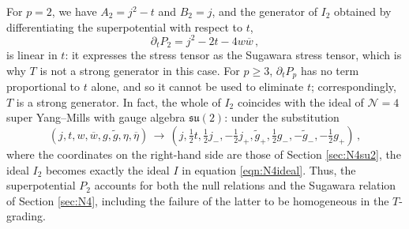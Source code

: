 \documentclass[12pt]{article}
\numberwithin{equation}{section}
\numberwithin{figure}{section}
\theoremstyle{plain}
\theoremstyle{definition}
\begin{document}
For $p = 2$, we have $A_2 = j^2 - t$ and $B_2 = j$, and the generator of $I_2$ obtained by differentiating the superpotential with respect to $t$,
\begin{equation}
    \partial_t P_2 = j^2 - 2t - 4 w \overline{w} \,,
\end{equation}
is linear in $t$: it expresses the stress tensor as the Sugawara stress tensor, which is why $T$ is not a strong generator in this case. For $p \geq 3$, $\partial_t P_p$ has no term proportional to $t$ alone, and so it cannot be used to eliminate $t$; correspondingly, $T$ is a strong generator. In fact, the whole of $I_2$ coincides with the ideal of $\mathcal{N}=4$ super Yang--Mills with gauge algebra $\mathfrak{su}(2)$: under the substitution
\begin{equation}
    (j, t, w, \overline{w}, g, \widetilde{g}, \eta, \overline{\eta}) \,\rightarrow\, \left(j, \tfrac{1}{2} t, \tfrac{1}{2} j_-, -\tfrac{1}{2} j_+, \widetilde{g}_+, \tfrac{1}{2} g_-, -\widetilde{g}_-, -\tfrac{1}{2} g_+\right) \,,
\end{equation}
where the coordinates on the right-hand side are those of Section \ref{sec:N4su2}, the ideal $I_2$ becomes exactly the ideal $I$ in equation \eqref{eqn:N4ideal}. Thus, the superpotential $P_2$ accounts for both the null relations and the Sugawara relation of Section \ref{sec:N4}, including the failure of the latter to be homogeneous in the $T$-grading.
\end{document}
